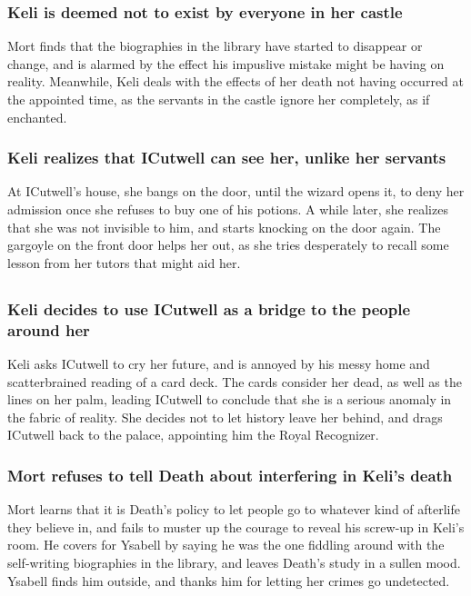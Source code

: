 \subsubsection{\Gls{Keli} is deemed not to exist by everyone in her castle}
\Gls{Mort} finds that the biographies in the library have started to disappear or change, and is
alarmed by the effect his impuslive mistake might be having on reality. Meanwhile, \Gls{Keli} deals
with the effects of her death not having occurred at the appointed time, as the servants in the
castle ignore her completely, as if enchanted.

\subsubsection{\Gls{Keli} realizes that \Gls{ICutwell} can see her, unlike her servants}
At \Gls{ICutwell}'s house, she bangs on the door, until the wizard opens it, to deny her admission
once she refuses to buy one of his potions. A while later, she realizes that she was not invisible
to him, and starts knocking on the door again. The gargoyle on the front door helps her out, as she
tries desperately to recall some lesson from her tutors that might aid her.

\subsection{}
\subsubsection{\Gls{Keli} decides to use \Gls{ICutwell} as a bridge to the people around her}
\Gls{Keli} asks \Gls{ICutwell} to cry her future, and is annoyed by his messy home and
scatterbrained reading of a card deck. The cards consider her dead, as well as the lines on her
palm, leading \Gls{ICutwell} to conclude that she is a serious anomaly in the fabric of reality.
She decides not to let history leave her behind, and drags \Gls{ICutwell} back to the palace,
appointing him the Royal Recognizer.

\subsubsection{\Gls{Mort} refuses to tell \Gls{Death} about interfering in \Gls{Keli}'s death}
\Gls{Mort} learns that it is \Gls{Death}'s policy to let people go to whatever kind of afterlife
they believe in, and fails to muster up the courage to reveal his screw-up in \Gls{Keli}'s room.
He covers for \Gls{Ysabell} by saying he was the one fiddling around with the self-writing
biographies in the library, and leaves \Gls{Death}'s study in a sullen mood. \Gls{Ysabell} finds
him outside, and thanks him for letting her crimes go undetected.

